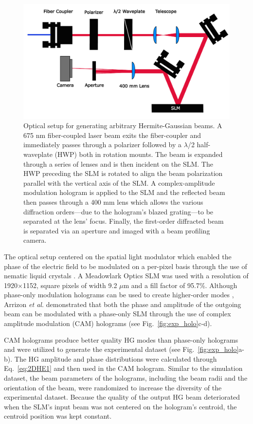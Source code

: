\documentclass[10pt,journal,compsoc]{IEEEtran}
\begin{document}
\begin{figure}%
\centering %
\includegraphics[width=.5\textwidth]{slm_setup.pdf} %
\caption[Table of Contents Figure Caption]{Optical setup for generating arbitrary Hermite-Gaussian beams. A 675 nm fiber-coupled laser beam exits the fiber-coupler and immediately passes through a polarizer followed by a $\lambda$/2 half-waveplate (HWP) both in rotation mounts. The beam is expanded through a series of lenses and is then incident on the SLM. The HWP preceding the SLM is rotated to align the beam polarization parallel with the vertical axis of the SLM. A complex-amplitude modulation hologram is applied to the SLM and the reflected beam then passes through a 400 mm lens which allows the various diffraction orders—due to the hologram's blazed grating—to be separated at the lens' focus. Finally, the first-order diffracted beam is separated via an aperture and imaged with a beam profiling camera.} %
\label{fig:experiment_setup} %
\end{figure}

The optical setup centered on the spatial light modulator which enabled the phase of the electric field to be modulated on a per-pixel basis through the use of nematic liquid crystals \cite{konforti1988phase}. A Meadowlark Optics SLM was used with a resolution of 1920$\times$1152, square pixels of width 9.2 $\mu$m and a fill factor of 95.7\%. Although phase-only modulation holograms can be used to create higher-order modes \cite{matsumoto2008generation}, Arrizon \textit{et al.} demonstrated that both the phase and amplitude of the outgoing beam can be modulated with a phase-only SLM \cite{arrizon2007pixelated} through the use of complex amplitude modulation (CAM) holograms (see Fig.~\ref{fig:exp_holo}c-d). 

CAM holograms produce better quality HG modes than phase-only holograms \cite{200Modes} and were utilized to generate the experimental dataset (see Fig.~\ref{fig:exp_holo}a-b). The HG amplitude and phase distributions were calculated through Eq.~\ref{eq:2DHE1} and then used in the CAM hologram. Similar to the simulation dataset, the beam parameters of the holograms, including the beam radii and the orientation of the beam, were randomized to increase the diversity of the experimental dataset. Because the quality of the output HG beam deteriorated when the SLM's input beam was not centered on the hologram's centroid, the centroid position was kept constant.
\end{document}
